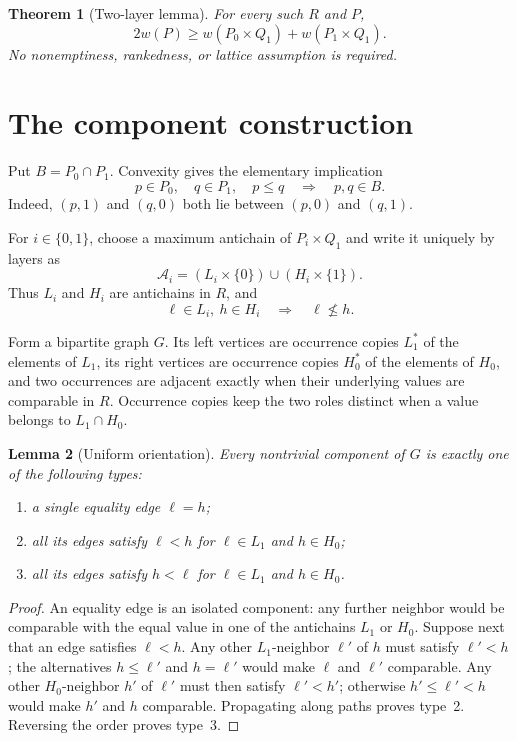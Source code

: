 \documentclass[11pt]{article}
\newtheorem{theorem}{Theorem}
\newtheorem{lemma}[theorem]{Lemma}
\newcommand{\Q}{Q}
\newcommand{\cA}{\mathcal A}
\begin{document}
\begin{theorem}[Two-layer lemma]\label{thm:two-layer}
For every such $R$ and $P$,
\[
  2w(P)\geq w(P_0\times\Q_1)+w(P_1\times\Q_1).
\]
No nonemptiness, rankedness, or lattice assumption is required.
\end{theorem}

\section{The component construction}

Put $B=P_0\cap P_1$.  Convexity gives the elementary implication
\begin{equation}\label{eq:convexity}
 p\in P_0,\quad q\in P_1,\quad p\leq q
 \quad\Longrightarrow\quad p,q\in B.
\end{equation}
Indeed, $(p,1)$ and $(q,0)$ both lie between $(p,0)$ and $(q,1)$.

For $i\in\{0,1\}$, choose a maximum antichain of $P_i\times\Q_1$ and
write it uniquely by layers as
\[
 \cA_i=(L_i\times\{0\})\cup(H_i\times\{1\}).
\]
Thus $L_i$ and $H_i$ are antichains in $R$, and
\begin{equation}\label{eq:input-cross}
 \ell\in L_i,\ h\in H_i\quad\Longrightarrow\quad \ell\not\leq h.
\end{equation}

Form a bipartite graph $G$.  Its left vertices are occurrence copies
$L_1^*$ of the elements of $L_1$, its right vertices are occurrence copies
$H_0^*$ of the elements of $H_0$, and two occurrences are adjacent exactly
when their underlying values are comparable in $R$.  Occurrence copies keep
the two roles distinct when a value belongs to $L_1\cap H_0$.

\begin{lemma}[Uniform orientation]\label{lem:orientation}
Every nontrivial component of $G$ is exactly one of the following types:
\begin{enumerate}
\item a single equality edge $\ell=h$;
\item all its edges satisfy $\ell<h$ for $\ell\in L_1$ and $h\in H_0$;
\item all its edges satisfy $h<\ell$ for $\ell\in L_1$ and $h\in H_0$.
\end{enumerate}
\end{lemma}

\begin{proof}
An equality edge is an isolated component: any further neighbor would be
comparable with the equal value in one of the antichains $L_1$ or $H_0$.
Suppose next that an edge satisfies $\ell<h$.  Any other $L_1$-neighbor
$\ell'$ of $h$ must satisfy $\ell'<h$; the alternatives $h\leq\ell'$ and
$h=\ell'$ would make $\ell$ and $\ell'$ comparable.  Any other
$H_0$-neighbor $h'$ of $\ell'$ must then satisfy $\ell'<h'$; otherwise
$h'\leq\ell'<h$ would make $h'$ and $h$ comparable.  Propagating along
paths proves type~2.  Reversing the order proves type~3.
\end{proof}
\end{document}
